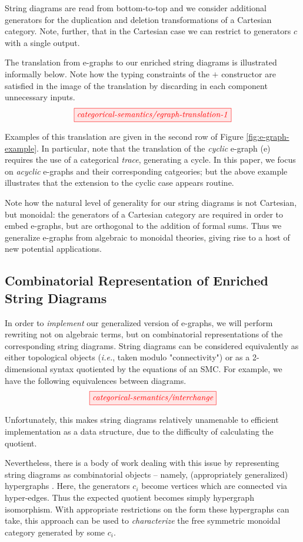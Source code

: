String diagrams are read from bottom-to-top and we consider additional generators for the duplication and deletion transformations of a Cartesian category.  Note, further, that in the Cartesian case we can restrict to generators $c$ with a single output. 

The translation from e-graphs to our enriched string diagrams is illustrated informally below. 
Note how the typing constraints of the $+$ constructor are satisfied in the image of the translation by discarding in each component unnecessary inputs.
\[
    \tikzfig{categorical-semantics/egraph-translation-1}
\]

Examples of this translation are given in the second row of Figure \ref{fig:e-graph-example}. In particular, note that the translation of the \textit{cyclic} e-graph (e)
requires the use of a categorical \textit{trace}, generating a cycle. In this paper, we focus on \textit{acyclic} e-graphs and their corresponding catgeories; but the above example illustrates that the extension to the cyclic case appears routine.

Note how the natural level of generality for our string diagrams is not Cartesian, but monoidal: the generators of a Cartesian category are required in order to embed e-graphs, but are orthogonal to the addition of formal sums. Thus we generalize e-graphs from algebraic to monoidal theories, giving rise to a  host of new potential applications.  

\subsection*{Combinatorial Representation of Enriched String Diagrams}

In order to \textit{implement} our generalized version of e-graphs, we will  perform rewriting not on algebraic terms, but on combinatorial representations of the corresponding string diagrams.  String diagrams can be considered equivalently as either topological objects (\textit{i.e.}, taken modulo "connectivity") or as a 2-dimensional syntax quotiented by the equations of an SMC. For example, we have the following equivalences between diagrams. 
\[
	\tikzfig{categorical-semantics/interchange}
\]

Unfortunately, this makes string diagrams relatively unamenable to efficient implementation as a data structure, due to the difficulty of calculating the quotient. 

Nevertheless, there is a body of work dealing with this issue by representing string diagrams as combinatorial objects -- namely, (appropriately generalized) hypergraphs 
\cite{bonchi_string_2022-1,bonchi_string_2022-2,bonchi_string_2022}.  Here, the generators $c_i$ become vertices which are connected via hyper-edges.  Thus the expected quotient becomes simply hypergraph isomorphism.  With appropriate restrictions on the form these hypergraphs can take, this approach can be used to \textit{characterize} the free symmetric monoidal category generated by some $c_i$. 

